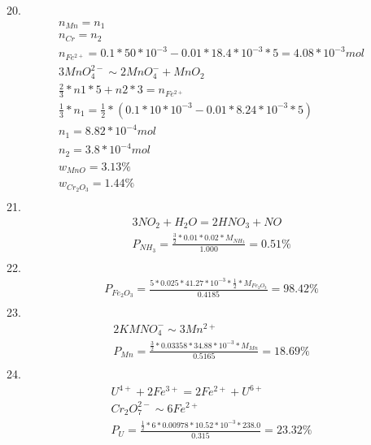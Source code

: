 \documentclass{article}
\begin{document}
20.\begin{equation}
    \begin{multlined}
        n_{Mn} = n_1\\
        n_{Cr} = n_2\\
        n_{Fe^{2+}} = 0.1*50*10^{-3} - 0.01*18.4*10^{-3}*5 = 4.08*10^{-3} mol\\
        3MnO_4^{2-} \sim 2MnO_4^- + MnO_2\\
        \frac{2}{3}*n1*5 + n2*3 = n_{Fe^{2+}}\\
        \frac{1}{3}*n_1 = \frac{1}{2}*(0.1*10*10^{-3} - 0.01*8.24*10^{-3}*5)\\
        n_1 = 8.82*10^{-4} mol\\
        n_2 = 3.8*10^{-4} mol\\
        w_{MnO} = 3.13\%\\
        w_{Cr_2O_3} = 1.44\%\\
    \end{multlined}
\end{equation}
21.\begin{equation}
    \begin{multlined}
        3NO_2 + H_2O = 2HNO_3 + NO\\
        P_{NH_3} = \frac{\frac{3}{2}*0.01 * 0.02 * M_{NH_3}}{1.000} = 0.51\%\\
    \end{multlined}
\end{equation}
22.\begin{equation}
    \begin{multlined}
        P_{Fe_2O_3} = \frac{5 * 0.025 * 41.27 * 10^{-3} * \frac{1}{2} * M_{Fe_2O_3}}{0.4185} = 98.42\%\\
    \end{multlined}
\end{equation}
23.\begin{equation}
    \begin{multlined}
        2KMNO_4^- \sim 3Mn^{2+}\\
        P_{Mn} = \frac{\frac{3}{2}*0.03358*34.88*10^{-3}*M_{Mn}}{0.5165} = 18.69\%\\
    \end{multlined}
\end{equation}
24.\begin{equation}
    \begin{multlined}
        U^{4+} + 2Fe^{3+} = 2Fe^{2+} + U^{6+}\\
        Cr_2O_7^{2-} \sim 6Fe^{2+}\\
        P_{U} = \frac{\frac{1}{2}*6*0.00978*10.52*10^{-3}*238.0}{0.315} = 23.32\%\\
    \end{multlined}
\end{equation}
\end{document}
